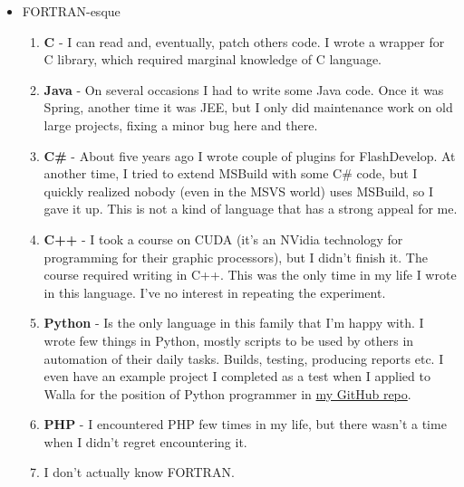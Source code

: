 \documentclass[oneside]{memoir}
\begin{document}
\begin{itemize}
\item FORTRAN-esque
\begin{enumerate}
\item \textbf{C} - I can read and, eventually, patch others code.  I wrote a wrapper
for C library, which required marginal knowledge of C language.
\item \textbf{Java} - On several occasions I had to write some Java code.  Once it was
Spring, another time it was JEE, but I only did maintenance work on old
large projects, fixing a minor bug here and there.
\item \textbf{C\#} - About five years ago I wrote couple of plugins for FlashDevelop.
At another time, I tried to extend MSBuild with some C\# code, but I
quickly realized nobody (even in the MSVS world) uses MSBuild, so I gave
it up.  This is not a kind of language that has a strong appeal for me.
\item \textbf{C++} - I took a course on CUDA (it's an NVidia technology for programming
for their graphic processors), but I didn't finish it.  The course
required writing in C++.  This was the only time in my life I wrote in
this language.  I've no interest in repeating the experiment.
\item \textbf{Python} - Is the only language in this family that I'm happy with.  I
wrote few things in Python, mostly scripts to be used by others in
automation of their daily tasks.  Builds, testing, producing reports etc.
I even have an example project I completed as a test when I applied to
Walla for the position of Python programmer in \href{https://github.com/wvxvw?tab%3Drepositories}{my GitHub repo}.
\item \textbf{PHP} - I encountered PHP few times in my life, but there wasn't a time
when I didn't regret encountering it.
\item I don't actually know FORTRAN.
\end{enumerate}


\end{itemize}
\end{document}
